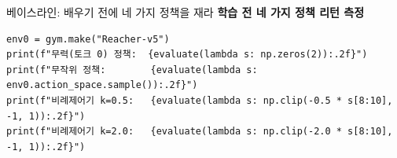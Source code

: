 \begin{frame}[fragile]{베이스라인: 배우기 전에 네 가지 정책을 재라}
  \textbf{학습 전 네 가지 정책 리턴 측정}
\begin{lstlisting}
env0 = gym.make("Reacher-v5")
print(f"무력(토크 0) 정책:  {evaluate(lambda s: np.zeros(2)):.2f}")
print(f"무작위 정책:        {evaluate(lambda s: env0.action_space.sample()):.2f}")
print(f"비례제어기 k=0.5:   {evaluate(lambda s: np.clip(-0.5 * s[8:10], -1, 1)):.2f}")
print(f"비례제어기 k=2.0:   {evaluate(lambda s: np.clip(-2.0 * s[8:10], -1, 1)):.2f}")
\end{lstlisting}

\end{frame}
